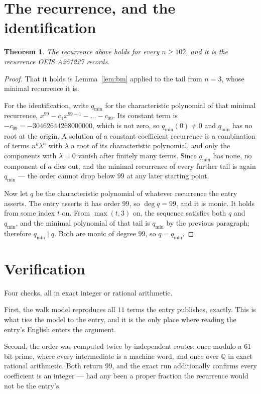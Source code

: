 \documentclass[11pt,a4paper]{article}
\theoremstyle{plain}
\newtheorem{theorem}{Theorem}
\theoremstyle{definition}
\begin{document}
\section{The recurrence, and the identification}

\begin{theorem}
The recurrence above holds for every $n\ge102$, and it is the recurrence OEIS A251227 records.
\end{theorem}

\begin{proof}
That it holds is Lemma~\ref{lem:bm} applied to the tail from $n=3$, whose minimal
recurrence it is.

For the identification, write $q_{\min}$ for the characteristic polynomial of that minimal
recurrence, $x^{99}-c_1x^{99-1}-\dots-c_{99}$. Its constant term is
$-c_{99}=-30462644268000000$, which is not zero, so $q_{\min}(0)\neq0$ and $q_{\min}$ has no
root at the origin. A solution of a constant-coefficient recurrence is a combination of terms
$n^{k}\lambda^{n}$ with $\lambda$ a root of its characteristic polynomial, and only the
components with $\lambda=0$ vanish after finitely many terms. Since $q_{\min}$ has none, no
component of $a$ dies out, and the minimal recurrence of every further tail is again
$q_{\min}$ --- the order cannot drop below $99$ at any later starting point.

Now let $q$ be the characteristic polynomial of whatever recurrence the entry asserts. The
entry asserts it has order $99$, so $\deg q=99$, and it is monic. It holds from some
index $t$ on. From $\max(t,3)$ on, the sequence satisfies both $q$ and $q_{\min}$, and
the minimal polynomial of that tail is $q_{\min}$ by the previous paragraph; therefore
$q_{\min}\mid q$. Both are monic of degree $99$, so $q=q_{\min}$.
\end{proof}

\section{Verification}

Four checks, all in exact integer or rational arithmetic.

First, the walk model reproduces all $11$ terms the entry publishes, exactly. This is
what ties the model to the entry, and it is the only place where reading the entry's English
enters the argument.

Second, the order was computed twice by independent routes: once modulo a $61$-bit prime, where
every intermediate is a machine word, and once over $\mathbb{Q}$ in exact rational arithmetic.
Both return $99$, and the exact run additionally confirms every coefficient is an integer
--- had any been a proper fraction the recurrence would not be the entry's.
\end{document}
